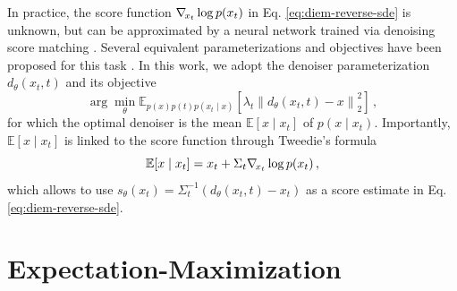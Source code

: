 In practice, the score function $\nabla_{\!{x_t}} \log p(x_t)$ in Eq. \eqref{eq:diem-reverse-sde} is unknown, but can be approximated by a neural network trained via denoising score matching \cite{hyvarinen2005estimation, vincent2011connection}. Several equivalent parameterizations and objectives have been proposed for this task \cite{song2019generative, ho2020denoising, song2021denoising, song2021scorebased, karras2022elucidating, lipman2023flow}. In this work, we adopt the denoiser parameterization $d_\theta(x_t, t)$ and its objective \cite{karras2022elucidating}
\begin{equation} \label{eq:diem-denoiser-objective}
    \arg\min_\theta \mathbb{E}_{p(x) p(t) p(x_t \mid x)} \left[ \lambda_t \left\| d_\theta(x_t, t) - x \right\|_2^2 \right] \, ,
\end{equation}
for which the optimal denoiser is the mean $\mathbb{E}[x \mid x_t]$ of $p(x \mid x_t)$. Importantly, $\mathbb{E}[x \mid x_t]$ is linked to the score function through Tweedie's formula \cite{tweedie1947functions, efron2011tweedies, kim2021noise2score, meng2021estimating}
\begin{equation} \label{eq:diem-optimal-denoiser}
    \mathbb{E}[x \mid x_t] = x_t + \Sigma_t \nabla_{\!{x_t}} \log p(x_t) \, ,
\end{equation}
which allows to use $s_\theta(x_t) = \Sigma_t^{-1} (d_\theta(x_t, t) - x_t)$ as a score estimate in Eq. \eqref{eq:diem-reverse-sde}.

\section{Expectation-Maximization} \label{sec:diem-em}

